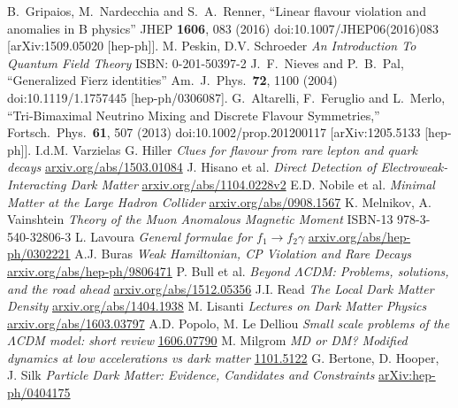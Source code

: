 \begin{thebibliography}{xxx}
  B.~Gripaios, M.~Nardecchia and S.~A.~Renner,
  ``Linear flavour violation and anomalies in B physics''
  JHEP {\bf 1606}, 083 (2016)
  doi:10.1007/JHEP06(2016)083
  [arXiv:1509.05020 [hep-ph]].
 M. Peskin, D.V. Schroeder \textit{An Introduction To Quantum Field Theory} ISBN: 0-201-50397-2
  J.~F.~Nieves and P.~B.~Pal, 
  ``Generalized Fierz identities''
  Am.\ J.\ Phys.\  {\bf 72}, 1100 (2004)
  doi:10.1119/1.1757445
  [hep-ph/0306087].
  G.~Altarelli, F.~Feruglio and L.~Merlo,
  ``Tri-Bimaximal Neutrino Mixing and Discrete Flavour Symmetries,''
  Fortsch.\ Phys.\  {\bf 61}, 507 (2013)
  doi:10.1002/prop.201200117
  [arXiv:1205.5133 [hep-ph]].
  I.d.M. Varzielas G. Hiller \textit{Clues for flavour from rare lepton and quark decays} \href{https://arxiv.org/abs/1503.01084}{arxiv.org/abs/1503.01084}
 J. Hisano et al. \textit{Direct Detection of Electroweak-Interacting Dark Matter} \href{https://arxiv.org/abs/1104.0228v2}{arxiv.org/abs/1104.0228v2}
 E.D. Nobile et al. \textit{Minimal Matter at the Large Hadron Collider} \href{http://arxiv.org/abs/0908.1567}{arxiv.org/abs/0908.1567}
 K. Melnikov, A. Vainshtein \textit{Theory of the Muon Anomalous Magnetic Moment} ISBN-13 978-3-540-32806-3
 L. Lavoura \textit{General formulae for $f_1\rightarrow f_2 \gamma$} \href{http://arxiv.org/abs/hep-ph/0302221}{arxiv.org/abs/hep-ph/0302221}
 A.J. Buras \textit{Weak Hamiltonian, CP Violation and Rare Decays} \href{http://arxiv.org/abs/hep-ph/9806471}{arxiv.org/abs/hep-ph/9806471}
 P. Bull et al. \textit{Beyond $\Lambda$CDM: Problems, solutions, and the road ahead} \href{http://arxiv.org/abs/1512.05356}{arxiv.org/abs/1512.05356}
 J.I. Read \textit{The Local Dark Matter Density} \href{http://arxiv.org/abs/1404.1938}{arxiv.org/abs/1404.1938}
 M. Lisanti \textit{Lectures on Dark Matter Physics} \href{https://arxiv.org/abs/1603.03797}{arxiv.org/abs/1603.03797}
 A.D. Popolo, M. Le Delliou \textit{Small scale problems of the $\Lambda$CDM model: short review} \href{https://arxiv.org/abs/1606.07790}{1606.07790}
 M. Milgrom \textit{MD or DM? Modified dynamics at low accelerations vs dark matter} \href{https://arxiv.org/abs/1101.5122}{1101.5122}
 G. Bertone, D. Hooper, J. Silk \textit{Particle Dark Matter: Evidence, Candidates and Constraints} \href{https://arxiv.org/abs/hep-ph/0404175}{arXiv:hep-ph/0404175}

\end{thebibliography}
